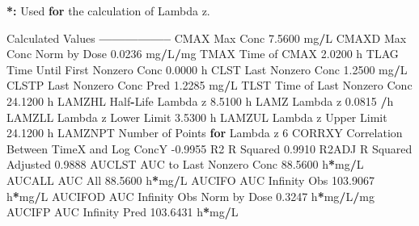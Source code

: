 \documentclass[12pt,]{krantz}
\newenvironment{Shaded}{\begin{snugshade}}{\end{snugshade}}
\newcommand{\ControlFlowTok}[1]{\textcolor[rgb]{0.13,0.29,0.53}{\textbf{#1}}}
\newcommand{\DecValTok}[1]{\textcolor[rgb]{0.00,0.00,0.81}{#1}}
\newcommand{\ErrorTok}[1]{\textcolor[rgb]{0.64,0.00,0.00}{\textbf{#1}}}
\newcommand{\FloatTok}[1]{\textcolor[rgb]{0.00,0.00,0.81}{#1}}
\newcommand{\NormalTok}[1]{#1}
\newcommand{\OperatorTok}[1]{\textcolor[rgb]{0.81,0.36,0.00}{\textbf{#1}}}
\newcommand{\StringTok}[1]{\textcolor[rgb]{0.31,0.60,0.02}{#1}}
\begin{document}
\begin{Shaded}
\begin{Highlighting}[]
{{{{{{{{\OperatorTok{*}\ErrorTok{:}\StringTok{ }\NormalTok{Used }\ControlFlowTok{for}\NormalTok{ the calculation of Lambda z.}


\NormalTok{Calculated Values}
\OperatorTok{-----------------}
\NormalTok{CMAX       Max Conc                                        }\FloatTok{7.5600}\NormalTok{ mg}\OperatorTok{/}\NormalTok{L}
\NormalTok{CMAXD      Max Conc Norm by Dose                           }\FloatTok{0.0236}\NormalTok{ mg}\OperatorTok{/}\NormalTok{L}\OperatorTok{/}\NormalTok{mg}
\NormalTok{TMAX       Time of CMAX                                    }\FloatTok{2.0200}\NormalTok{ h}
\NormalTok{TLAG       Time Until First Nonzero Conc                   }\FloatTok{0.0000}\NormalTok{ h}
\NormalTok{CLST       Last Nonzero Conc                               }\FloatTok{1.2500}\NormalTok{ mg}\OperatorTok{/}\NormalTok{L}
\NormalTok{CLSTP      Last Nonzero Conc Pred                          }\FloatTok{1.2285}\NormalTok{ mg}\OperatorTok{/}\NormalTok{L}
\NormalTok{TLST       Time of Last Nonzero Conc                      }\FloatTok{24.1200}\NormalTok{ h}
\NormalTok{LAMZHL     Half}\OperatorTok{-}\NormalTok{Life Lambda z                              }\FloatTok{8.5100}\NormalTok{ h}
\NormalTok{LAMZ       Lambda z                                        }\FloatTok{0.0815} \OperatorTok{/}\NormalTok{h}
\NormalTok{LAMZLL     Lambda z Lower Limit                            }\FloatTok{3.5300}\NormalTok{ h}
\NormalTok{LAMZUL     Lambda z Upper Limit                           }\FloatTok{24.1200}\NormalTok{ h}
\NormalTok{LAMZNPT    Number of Points }\ControlFlowTok{for}\NormalTok{ Lambda z                   }\DecValTok{6}
\NormalTok{CORRXY     Correlation Between TimeX and Log ConcY        }\FloatTok{-0.9955} 
\NormalTok{R2         R Squared                                       }\FloatTok{0.9910} 
\NormalTok{R2ADJ      R Squared Adjusted                              }\FloatTok{0.9888} 
\NormalTok{AUCLST     AUC to Last Nonzero Conc                       }\FloatTok{88.5600}\NormalTok{ h}\OperatorTok{*}\NormalTok{mg}\OperatorTok{/}\NormalTok{L}
\NormalTok{AUCALL     AUC All                                        }\FloatTok{88.5600}\NormalTok{ h}\OperatorTok{*}\NormalTok{mg}\OperatorTok{/}\NormalTok{L}
\NormalTok{AUCIFO     AUC Infinity Obs                              }\FloatTok{103.9067}\NormalTok{ h}\OperatorTok{*}\NormalTok{mg}\OperatorTok{/}\NormalTok{L}
\NormalTok{AUCIFOD    AUC Infinity Obs Norm by Dose                   }\FloatTok{0.3247}\NormalTok{ h}\OperatorTok{*}\NormalTok{mg}\OperatorTok{/}\NormalTok{L}\OperatorTok{/}\NormalTok{mg}
\NormalTok{AUCIFP     AUC Infinity Pred                             }\FloatTok{103.6431}\NormalTok{ h}\OperatorTok{*}\NormalTok{mg}\OperatorTok{/}\NormalTok{L}
}}}}}}}}
\end{Highlighting}
\end{Shaded}
\end{document}
